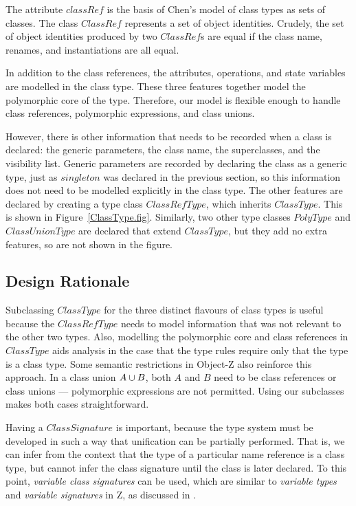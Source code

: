 The attribute $classRef$ is the basis of Chen's model of class types
as sets of classes. The class $ClassRef$ represents a set of
object identities. Crudely, the set of object identities produced by
two $ClassRef$s are equal if the class name, renames, and
instantiations are all equal.

In addition to the class references, the attributes, operations, and
state variables are modelled in the class type. These three features
together model the polymorphic core of the type. Therefore, our model
is flexible enough to handle class references, polymorphic
expressions, and class unions.

However, there is other information that needs to be recorded when a
class is declared: the generic parameters, the
class name, the superclasses, and the visibility list. Generic
parameters are recorded by declaring the class as a generic type, just
as $singleton$ was declared in the previous section, so this
information does not need to be modelled explicitly in the class
type. The other features are declared by creating a type class
$ClassRefType$, which inherits $ClassType$. This is shown in
Figure~\ref{ClassType.fig}. Similarly, two other type classes
$PolyType$ and $ClassUnionType$ are declared that extend $ClassType$,
but they add no extra features, so are not shown in the figure.

\subsection{Design Rationale}

Subclassing $ClassType$ for the three 
distinct flavours of
class types
is useful because
the
$ClassRefType$ needs to model information that was not relevant to
the other two types. Also, modelling the polymorphic core and class
references in $ClassType$ aids analysis in the case that the
type rules require only
that the type is a class type.
Some semantic restrictions in Object-Z also reinforce this approach.
In a class union $A \classuni B$,
both $A$ and $B$ need to be class references or class unions ---
polymorphic expressions are not permitted. Using our subclasses makes
both cases straightforward.

Having a $ClassSignature$ is important, because the type system must
be developed in such a way that unification can be partially
performed. That is, we can infer from the context that the type of a
particular name reference is a class type, but cannot infer the class
signature until the class is later declared.  To this point, {\em
variable class signatures} can be used, which are similar to {\em
variable types} and {\em variable signatures} in Z, as discussed in
\cite{toyn00}. 

